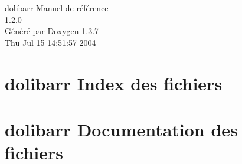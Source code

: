 \documentclass[a4paper]{book}
\begin{document}
\begin{titlepage}
\vspace*{7cm}
\begin{center}
{\Large dolibarr Manuel de r\'{e}f\'{e}rence\\[1ex]\large 1.2.0 }\\
\vspace*{1cm}
{\large G\'{e}n\'{e}r\'{e} par Doxygen 1.3.7}\\
\vspace*{0.5cm}
{\small Thu Jul 15 14:51:57 2004}\\
\end{center}
\end{titlepage}
\clearemptydoublepage
{}
\tableofcontents
\clearemptydoublepage
{}
\chapter{dolibarr Index des fichiers}

\chapter{dolibarr Documentation des fichiers}





\printindex
\end{document}
